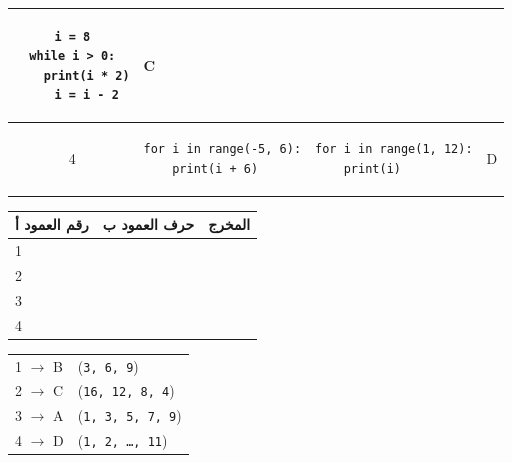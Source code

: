 \documentclass[14pt]{extarticle}
\begin{document}
{\begin{longtable}{|c|p{}|p{}|c|}
\begin{pycell}
\begin{english}
\begin{verbatim}
i = 8
while i > 0:
    print(i * 2)
    i = i - 2
\end{verbatim}
\end{english}
\end{pycell} & \textenglish{C} \\
\hline
4 &
\begin{pycell}
\begin{english}
\begin{verbatim}
for i in range(-5, 6):
    print(i + 6)
\end{verbatim}
\end{english}
\end{pycell} &
\begin{pycell}
\begin{english}
\begin{verbatim}
for i in range(1, 12):
    print(i)
\end{verbatim}
\end{english}
\end{pycell} & \textenglish{D} \\
\hline
\end{longtable}
}

\vspace{1.5cm}
\begin{center}
\renewcommand{\arraystretch}{1.3}
\begin{tabular}{|p{2cm}|p{3cm}|p{6cm}|}
\hline
رقم العمود أ &  حرف العمود ب & المخرج \\
\hline
1 &  &  \\
\hline
2 &  &  \\
\hline
3 &  &  \\
\hline
4 &  &  \\
\hline
\end{tabular}
\end{center}

\ifwithsols
\begin{boxSolution}
\begin{english}
\begin{tabular}{ll}
1 $\rightarrow$ B & (\texttt{3, 6, 9}) \\
2 $\rightarrow$ C & (\texttt{16, 12, 8, 4}) \\
3 $\rightarrow$ A & (\texttt{1, 3, 5, 7, 9}) \\
4 $\rightarrow$ D & (\texttt{1, 2, \ldots, 11}) \\
\end{tabular}
\end{english}
\end{boxSolution}
\fi
\end{document}
